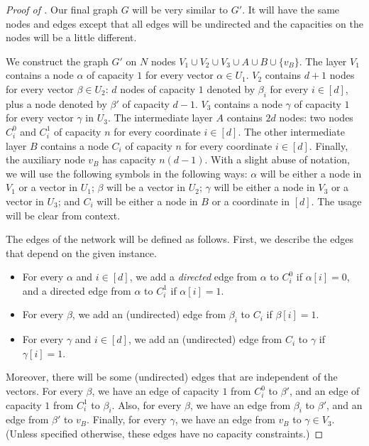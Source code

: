 \begin{proof}[Proof of ]
Our final graph $G$ will be very similar to $G'$. It will have the same nodes and edges except that all edges will be undirected and the capacities on the nodes will be a little different.

We construct the graph $G'$ on $N$ nodes $V_1\cup V_2\cup V_3\cup A\cup B\cup \{v_B\}$.
The layer $V_1$ contains a node $\alpha$ of capacity $1$ for every vector $\alpha\in U_1$.
$V_2$ contains $d+1$ nodes for every vector $\beta\in U_2$: $d$ nodes of capacity $1$ denoted by $\beta_i$ for every $i\in[d]$, plus a node denoted by $\beta'$ of capacity $d-1$.
$V_3$ contains a node $\gamma$ of capacity $1$ for every vector $\gamma$ in $U_3$.
The intermediate layer $A$ contains $2d$ nodes: two nodes $C_i^{0}$ and $C_i^{1}$ of capacity $n$ for every coordinate $i\in [d]$.
The other intermediate layer $B$ contains a node $C_i$ of capacity $n$ for every coordinate $i\in [d]$.
Finally, the auxiliary node $v_B$ has capacity $n(d-1)$.
With a slight abuse of notation, we will use the following symbols in the following ways: $\alpha$ will be either a node in $V_1$ or a vector in $U_1$; $\beta$ will be a vector in $U_2$;  $\gamma$ will be either a node in $V_3$ or a vector in $U_3$; and $C_i$ will be either a node in $B$ or a coordinate in $[d]$. The usage will be clear from context.

The edges of the network will be defined as follows. First, we describe the edges that depend on the given \TOV instance.
\begin{itemize}
\item For every $\alpha$ and $i\in [d]$, we add a \emph{directed} edge from $\alpha$ to $C_i^{0}$ if $\alpha [i]=0$, and a directed edge from $\alpha$ to $C_i^{1}$ if $\alpha [i]=1$.
\item For every $\beta$, we add an (undirected) edge from $\beta_i$ to $C_i$ if $\beta [i]=1$.
\item  For every $\gamma$ and $i\in [d]$, we add an (undirected) edge from $C_i$ to $\gamma$ if $\gamma [i]=1$.
\end{itemize}
Moreover, there will be some (undirected) edges that are independent of the vectors.
For every $\beta$, we have an edge of capacity $1$ from $C_i^{0}$ to ${\beta}'$, and an edge of capacity $1$ from $C_i^{1}$ to $\beta_i$.
Also, for every $\beta$, we have an edge from $\beta_i$ to $\beta'$, and an edge from ${\beta}'$ to $v_B$.
Finally, for every $\gamma$, we have an edge from $v_B$ to $\gamma\in V_3$. (Unless specified otherwise, these edges have no capacity constraints.)


\end{proof}
